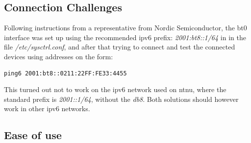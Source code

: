 \subsection{Connection Challenges}

Following instructions from a representative from Nordic Semiconductor, the bt0 interface was set up using the recommended \gls{ipv6} prefix: \textit{2001:bt8::1/64} in in the file \textit{/etc/sysctrl.conf}, and after that trying to connect and test the connected devices using addresses on the form: 

\begin{verbatim}
ping6 2001:bt8::0211:22FF:FE33:4455
\end{verbatim}

This turned out not to work on the \gls{ipv6} network used on \gls{ntnu}, where the standard prefix is \textit{2001::1/64}, without the \textit{db8}. Both solutions should however work in other \gls{ipv6} networks. 





\subsection{Ease of use}








